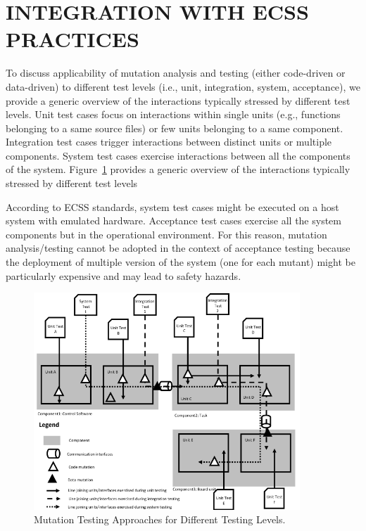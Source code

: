
\STARTCHANGEDWPT
\section{INTEGRATION WITH ECSS PRACTICES}
\label{sec:isvv}

To discuss applicability of mutation analysis and testing (either code-driven or data-driven) to different test levels (i.e., unit, integration, system, acceptance), we provide a generic overview of the interactions typically stressed by different test levels. Unit test cases focus on interactions within single units (e.g., functions belonging to a same source files) or few units belonging to a same component. Integration test cases trigger interactions between distinct units or multiple components. System test cases exercise interactions between all the components of the system.
Figure~\ref{fig:mutationTestingVSTestingLevels} provides a generic overview of the interactions typically stressed by different test levels

According to ECSS standards, system test cases might be executed on a host system with emulated hardware. Acceptance test cases exercise all the system components but in the operational environment. For this reason, mutation analysis/testing cannot be adopted in the context of acceptance testing because the deployment of multiple version of the system (one for each mutant) might be particularly expensive and may lead to safety hazards.

\begin{figure}[h]
  \centering
    \includegraphics[width=10cm]{images/TestingLevels}
      \caption{Mutation Testing Approaches for Different Testing Levels.}
      \label{fig:mutationTestingVSTestingLevels}
\end{figure}

